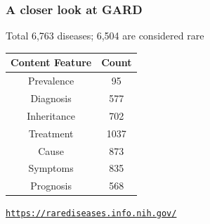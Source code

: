 ﻿\documentclass[anchorcolor=blue,linkcolor=blue]{beamer}
\begin{document}
\begin{frame}
  \frametitle{A closer look at GARD}
    
  \begin{block}{Total 6,763 diseases; 6,504 are considered rare}
    \begin{center}
      \begin{tabular}{cc}\toprule
        Content Feature & Count\\ \midrule
        Prevalence & 95 \\
        Diagnosis & 577\\
        Inheritance & 702\\
        Treatment & 1037\\
        Cause & 873\\
        Symptoms & 835\\
        Prognosis & 568\\ \bottomrule
      \end{tabular}
    \end{center}
  \end{block}
  
  \centerline{\href{https://rarediseases.info.nih.gov/}{\texttt{https://rarediseases.info.nih.gov/}}}
\end{frame}
\end{document}
